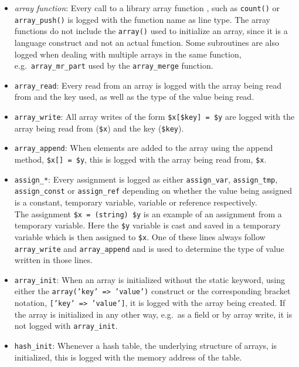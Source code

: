 \begin{itemize}
\item \emph{array function}: Every call to a library array function , such as \texttt{count()} or \texttt{array\_push()} is logged with the function name as line type. The array functions do not include the \texttt{array()} used to initialize an array, since it is a language construct and not an actual function. Some subroutines are also logged when dealing with multiple arrays in the same function, e.g.\ \texttt{array\_mr\_part} used by the \texttt{array\_merge} function.
\item \texttt{array\_read}: Every read from an array is logged with the array being read from and the key used, as well as the type of the value being read.
\item \texttt{array\_write}: All array writes of the form \texttt{\$x[\$key] = \$y} are logged with the array being read from (\texttt{\$x}) and the key (\texttt{\$key}). 
\item \texttt{array\_append}: When elements are added to the array using the append method, \texttt{\$x[] = \$y}, this is logged with the array being read from, \texttt{\$x}.
\item \texttt{assign\_*}: Every assignment is logged as either \texttt{assign\_var}, \texttt{assign\_tmp}, \texttt{assign\_const} or \texttt{assign\_ref} depending on whether the value being assigned is a constant, temporary variable, variable or reference respectively.\\
The assignment \texttt{\$x = (string) \$y} is an example of an assignment from a temporary variable. Here the \texttt{\$y} variable is cast and saved in a temporary variable which is then assigned to \texttt{\$x}. One of these lines always follow \texttt{array\_write} and \texttt{array\_append} and is used to determine the type of value written in those lines.
\item \texttt{array\_init}: When an array is initialized without the static keyword, using either the \texttt{array('key' => 'value')} construct or the corresponding bracket notation, \texttt{['key' => 'value']}, it is logged with the array being created. If the array is initialized in any other way, e.g.\ as a field or by array write, it is not logged with \texttt{array\_init}.
\item \texttt{hash\_init}: Whenever a hash table, the underlying structure of arrays, is initialized, this is logged with the memory address of the table.
\end{itemize}

